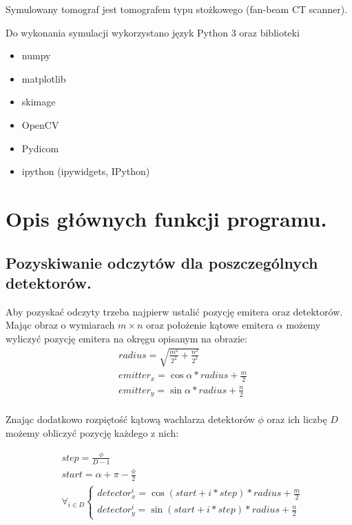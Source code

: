 \documentclass[a4paper, 11pt]{article}
\begin{document}
Symulowany tomograf jest tomografem typu stożkowego (fan-beam CT scanner).

Do wykonania symulacji wykorzystano język Python 3 oraz biblioteki

\begin{itemize}
	\item numpy
	\item matplotlib
	\item skimage
	\item OpenCV
	\item Pydicom
	\item ipython (ipywidgets, IPython)
\end{itemize}

\section{Opis głównych funkcji programu.}

\subsection{Pozyskiwanie odczytów dla poszczególnych detektorów.}

Aby pozyskać odczyty trzeba najpierw ustalić pozycję emitera oraz detektorów.\\
Mając obraz o wymiarach $m \times n$ oraz położenie kątowe emitera $\alpha$
możemy wyliczyć pozycję emitera na okręgu opisanym na obrazie:
\begin{align*}
	 & radius = \sqrt{\frac{m^2}{2^2} + \frac{n^2}{2^2}} \\
	 & emitter_x = \cos\alpha * radius + \frac{m}{2}     \\
	 & emitter_y = \sin\alpha * radius + \frac{n}{2}     \\
\end{align*}

Znając dodatkowo rozpiętość kątową wachlarza detektorów $\phi$ oraz ich liczbę $D$ możemy obliczyć pozycję każdego z nich:

\begin{align*}
	 & step = \frac{\phi}{D - 1}             \\
	 & start = \alpha + \pi - \frac{\phi}{2} \\
	 & \forall_{i \in D}
	\begin{cases}
		detector^{i}_{x} = \cos(start + i * step) * radius + \frac{m}{2} \\
		detector^{i}_{y} = \sin(start + i * step) * radius + \frac{n}{2}
	\end{cases}
\end{align*}
\end{document}
